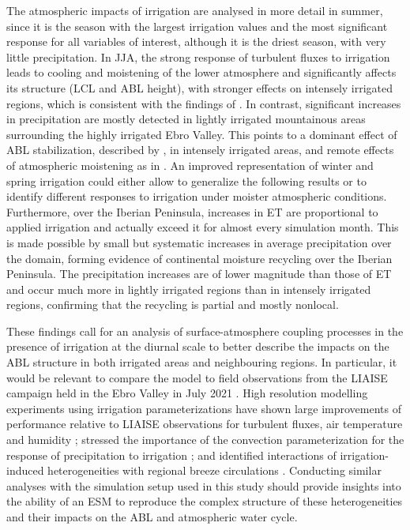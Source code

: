 The atmospheric impacts of irrigation are analysed in more detail in summer, since it is the season with the largest irrigation values and the most significant response for all variables of interest, although it is the driest season, with very little precipitation. 
In JJA, the strong response of turbulent fluxes to irrigation leads to cooling and moistening of the lower atmosphere and significantly affects its structure (LCL and ABL height), with stronger effects on intensely irrigated regions, which is consistent with the findings of \citet{rappin_landatmosphere_2022}. In contrast, significant increases in precipitation are mostly detected in lightly irrigated mountainous areas surrounding the highly irrigated Ebro Valley. This points to a dominant effect of ABL stabilization, described by \citet{findell_atmospheric_2003-1, ek_influence_2004}, in intensely irrigated areas, and remote effects of atmospheric moistening as in \citet{deangelis_evidence_2010, lo_irrigation_2013, yang_impact_2017}. 
An improved representation of winter and spring irrigation could either allow to generalize the following results or to identify different responses to irrigation under moister atmospheric conditions.
Furthermore, over the Iberian Peninsula, increases in ET are proportional to applied irrigation and actually exceed it for almost every simulation month. This is made possible by small but systematic increases in average precipitation over the domain, forming evidence of continental moisture recycling over the Iberian Peninsula. The precipitation increases are of lower magnitude than those of ET and occur much more in lightly irrigated regions than in intensely irrigated regions, confirming that the recycling is partial and mostly nonlocal.

These findings call for an analysis of surface-atmosphere coupling processes in the presence of irrigation at the diurnal scale to better describe the impacts on the ABL structure in both irrigated areas and neighbouring regions.
In particular, it would be relevant to compare the model to field observations from the LIAISE campaign held in the Ebro Valley in July 2021 \citep{boone_land_2025}. High resolution modelling experiments using irrigation parameterizations have shown large improvements of performance relative to LIAISE observations for turbulent fluxes, air temperature and humidity \citep{lunel_irrigation_2024, udina_irrigation_2024}; stressed the importance of the convection parameterization for the response of precipitation to irrigation \citep{udina_irrigation_2024}; and identified interactions of irrigation-induced heterogeneities with regional breeze circulations \citep{lunel_marinada_2024}. Conducting similar analyses with the simulation setup used in this study should provide insights into the ability of an ESM to reproduce the complex structure of these heterogeneities \citep{mangan_surface-boundary_2023} and their impacts on the ABL and atmospheric water cycle. 

